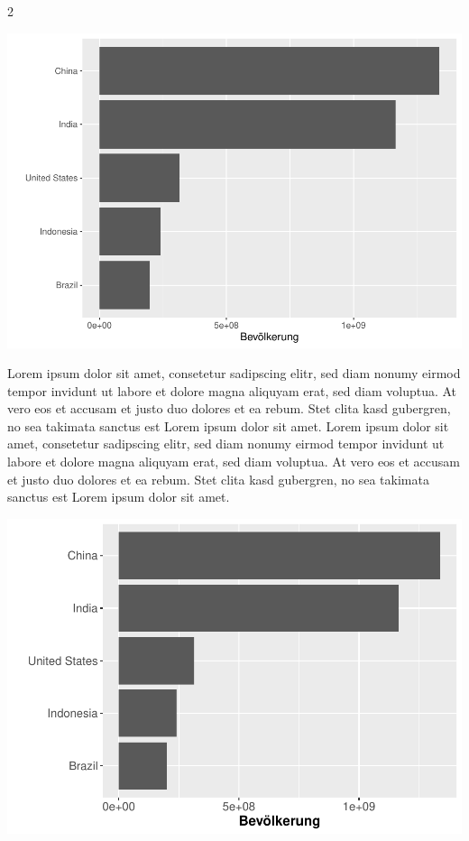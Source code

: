 \documentclass[
  twoside]{article}
\begin{document}
\begin {multicols}{2}

\includegraphics[width=1\linewidth]{PDF_Latex_files/figure-latex/unnamed-chunk-3-1}

Lorem ipsum dolor sit amet, consetetur sadipscing elitr, sed diam nonumy
eirmod tempor invidunt ut labore et dolore magna aliquyam erat, sed diam
voluptua. At vero eos et accusam et justo duo dolores et ea rebum. Stet
clita kasd gubergren, no sea takimata sanctus est Lorem ipsum dolor sit
amet. Lorem ipsum dolor sit amet, consetetur sadipscing elitr, sed diam
nonumy eirmod tempor invidunt ut labore et dolore magna aliquyam erat,
sed diam voluptua. At vero eos et accusam et justo duo dolores et ea
rebum. Stet clita kasd gubergren, no sea takimata sanctus est Lorem
ipsum dolor sit amet. \columnbreak

\includegraphics[width=1\linewidth]{PDF_Latex_files/figure-latex/unnamed-chunk-4-1}


\end{multicols}
\end{document}
